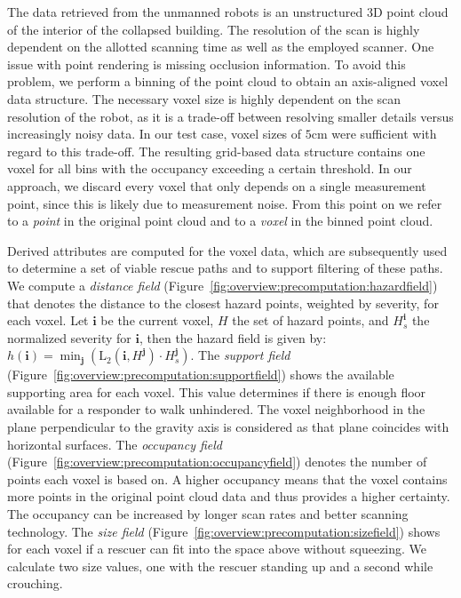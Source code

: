  The data retrieved from the unmanned robots is an unstructured 3D point cloud of the interior of the collapsed building. The resolution of the scan is highly dependent on the allotted scanning time as well as the employed scanner. One issue with point rendering is missing occlusion information. To avoid this problem, we perform a binning of the point cloud to obtain an axis-aligned voxel data structure. The necessary voxel size is highly dependent on the scan resolution of the robot, as it is a trade-off between resolving smaller details versus increasingly noisy data. In our test case, voxel sizes of $5$cm were sufficient with regard to this trade-off. The resulting grid-based data structure contains one voxel for all bins with the occupancy exceeding a certain threshold. In our approach, we discard every voxel that only depends on a single measurement point, since this is likely due to measurement noise. From this point on we refer to a \emph{point} in the original point cloud and to a \emph{voxel} in the binned point cloud.

 Derived attributes are computed for the voxel data, which are subsequently used to determine a set of viable rescue paths and to support filtering of these paths. We compute a \emph{distance field} (Figure~\ref{fig:overview:precomputation:hazardfield}) that denotes the distance to the closest hazard points, weighted by severity, for each voxel. Let $\mathbf{i}$ be the current voxel, $H$ the set of hazard points, and $H^{\mathbf{i}}_s$ the normalized severity for $\mathbf{i}$, then the hazard field is given by: $h(\mathbf{i}) = \min_\mathbf{j}(\mathrm{L}_2(\mathbf{i}, H^\mathbf{j}) \cdot H^\mathbf{j}_s)$. The \emph{support field} (Figure~\ref{fig:overview:precomputation:supportfield}) shows the available supporting area for each voxel. This value determines if there is enough floor available for a responder to walk unhindered. The voxel neighborhood in the plane perpendicular to the gravity axis is considered as that plane coincides with horizontal surfaces. The \emph{occupancy field} (Figure~\ref{fig:overview:precomputation:occupancyfield}) denotes the number of  points each voxel is based on. A higher occupancy means that the voxel contains more points in the original point cloud data and thus provides a higher certainty. The occupancy can be increased by longer scan rates and better scanning technology. The \emph{size field} (Figure~\ref{fig:overview:precomputation:sizefield}) shows for each voxel if a rescuer can fit into the space above without squeezing. We calculate two size values, one with the rescuer standing up and a second while crouching.

